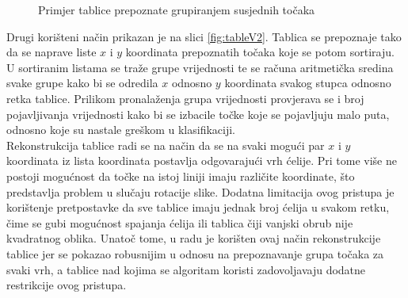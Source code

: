 \documentclass[times, utf8, zavrsni, numeric]{fer}
\begin{document}
\begin{figure}[!ht]
    \centering
    \captionsetup{justification=centering}
    \caption{Primjer tablice prepoznate grupiranjem susjednih točaka}
    \label{fig:tableV1}
\end{figure}

Drugi korišteni način prikazan je na slici \ref{fig:tableV2}.
Tablica se prepoznaje tako da se naprave liste $x$ i $y$ koordinata prepoznatih točaka koje se potom sortiraju.
U sortiranim listama se traže grupe vrijednosti te se računa aritmetička sredina svake grupe kako bi se odredila $x$ odnosno $y$ koordinata svakog stupca odnosno retka tablice. 
Prilikom pronalaženja grupa vrijednosti provjerava se i broj pojavljivanja vrijednosti kako bi se izbacile točke koje se pojavljuju malo puta, odnosno koje su nastale greškom u klasifikaciji.\\

Rekonstrukcija tablice radi se na način da se na svaki mogući par $x$
i $y$ koordinata iz lista koordinata postavlja odgovarajući vrh ćelije.
Pri tome više ne postoji mogućnost da točke na istoj liniji imaju različite koordinate, što predstavlja problem u slučaju rotacije slike.
Dodatna limitacija ovog pristupa je korištenje pretpostavke da sve tablice imaju jednak broj ćelija u svakom retku, čime se gubi mogućnost spajanja ćelija ili tablica čiji vanjski obrub nije kvadratnog oblika.
Unatoč tome, u radu je korišten ovaj način rekonstrukcije tablice jer se pokazao robusnijim u odnosu na prepoznavanje grupa točaka za svaki vrh, a tablice nad kojima se algoritam koristi zadovoljavaju dodatne restrikcije ovog pristupa.\\
\end{document}
